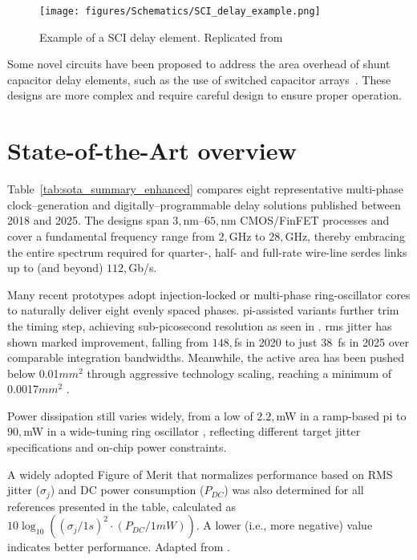 \begin{figure}[h]
    \centering
    \texttt{[image: figures/Schematics/SCI\_delay\_example.png]}
    \caption{Example of a SCI delay element. Replicated from~\protect\cite{Angeli_2018}}\label{fig:sci_delay_eg}
\end{figure}

Some novel circuits have been proposed to address the area overhead of shunt capacitor delay elements, such as the use of switched capacitor arrays~\cite{Ramazanoglu2018switched}. These designs are more complex and require careful design to ensure proper operation.

\section{State-of-the-Art overview}
Table~\ref{tab:sota_summary_enhanced} compares eight representative multi-phase clock–generation and digitally–programmable delay solutions published between 2018 and 2025. The designs span $3,$nm–$65,$nm CMOS/FinFET processes and cover a fundamental frequency range from $2,$GHz to $28,$GHz, thereby embracing the entire spectrum required for quarter-, half- and full-rate wire-line \gls{serdes} links up to (and beyond) $112,$Gb/s.

Many recent prototypes adopt injection-locked or multi-phase ring-oscillator cores to naturally deliver eight evenly spaced phases. \gls{pi}-assisted variants further trim the timing step, achieving sub-picosecond resolution as seen in \cite{Mishra2022ISSCC}. \gls{rms} jitter has shown marked improvement, falling from $148,$fs in 2020 \cite{Chen2020VLSIC} to just 38~fs in 2025 \cite{Tian2025ISSCC} over comparable integration bandwidths. Meanwhile, the active area has been pushed below 0.01\(mm^2\) through aggressive technology scaling, reaching a minimum of 0.0017\(mm^2\) \cite{Chen2020VLSIC}.

Power dissipation still varies widely, from a low of $2.2,$mW in a ramp-based \gls{pi} \cite{Mohapatra2024ISSCC} to $90,$mW in a wide-tuning ring oscillator \cite{Tian2025ISSCC}, reflecting different target jitter specifications and on-chip power constraints.

A widely adopted Figure of Merit that normalizes performance based on RMS jitter ($\sigma_j$) and DC power consumption ($P_{DC}$) was also determined for all references presented in the table, calculated as $10 \log_{10} ((\sigma_j / 1s)^2 \cdot (P_{DC} / 1mW))$. A lower (i.e., more negative) value indicates better performance. Adapted from \cite{Lu2022JSSC}.

